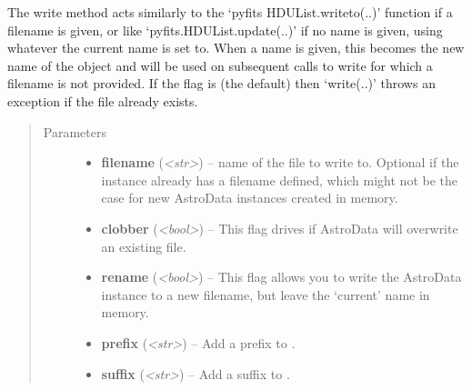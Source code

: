 \documentclass[letterpaper,10pt,english]{sphinxmanual}
\begin{document}
\begin{fulllineitems}
\begin{fulllineitems}
\label{astro_class:astrodata.AstroData.AstroData.write}
The write method acts similarly to the `pyfits HDUList.writeto(..)'
function if a filename is given, or like `pyfits.HDUList.update(..)' if 
no name is given, using whatever the current name is set to. When a name
is given, this becomes the new name of the  object and
will be used on subsequent calls to  write for which a filename is not
provided. If the  flag is  (the default) then 
`write(..)' throws an exception if the file already exists.
\begin{quote}\begin{description}
\item[{Parameters}] \leavevmode\begin{itemize}
\item {} 
\textbf{filename} (\emph{\textless{}str\textgreater{}}) -- name of the file to write to. Optional if the instance
already has a filename defined, which might not be the 
case for new AstroData instances created in memory.

\item {} 
\textbf{clobber} (\emph{\textless{}bool\textgreater{}}) -- This flag drives if AstroData will overwrite an existing
file.

\item {} 
\textbf{rename} (\emph{\textless{}bool\textgreater{}}) -- This flag allows you to write the AstroData instance to
a new filename, but leave the `current' name in memory.

\item {} 
\textbf{prefix} (\emph{\textless{}str\textgreater{}}) -- Add a prefix to .

\item {} 
\textbf{suffix} (\emph{\textless{}str\textgreater{}}) -- Add a suffix to .

\end{itemize}

\end{description}\end{quote}

\end{fulllineitems}


\end{fulllineitems}
\end{document}
